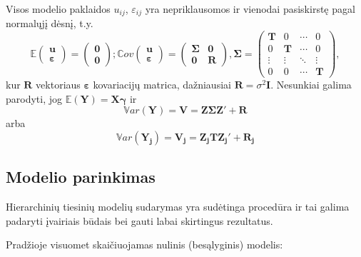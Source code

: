 \documentclass[11pt,a4paper]{article}
\begin{document}
Visos modelio paklaidos $u_{ij}$, $\varepsilon_{ij}$ yra nepriklausomos ir vienodai pasiskirstę pagal normalųjį dėsnį, t.y.
\[\mathbb{E}\begin{pmatrix}
\mathbf{u} \\
\boldsymbol{\varepsilon}
\end{pmatrix}=
\begin{pmatrix}
\mathbf{0} \\
\mathbf{0}
\end{pmatrix};
\mathbb{C}ov\begin{pmatrix}
\mathbf{u} \\
\boldsymbol{\varepsilon}
\end{pmatrix}=
\begin{pmatrix}
\mathbf{\Sigma}&\mathbf{0} \\
\mathbf{0}&\mathbf{R}
\end{pmatrix},
\mathbf{\Sigma}=
\begin{pmatrix}
\mathbf{T} & 0 & \cdots & 0 \\
0 & \mathbf{T} & \cdots & 0\\
\vdots & \vdots & \ddots & \vdots \\
0&0 & \cdots & \mathbf{T}
\end{pmatrix},
\]
kur $\mathbf{R}$ vektoriaus $\boldsymbol{\varepsilon}$ kovariacijų matrica, dažniausiai $\mathbf{R}=\sigma^2\mathbf{I}$. Nesunkiai galima parodyti, jog $\mathbb{E}(\mathbf{Y})=\mathbf{X}\boldsymbol{\gamma}$ ir
\begin{equation} \label{eq:var}
\mathbb{V}ar(\mathbf{Y})=\mathbf{V}=\mathbf{Z\Sigma Z}'+\mathbf{R}
\end{equation}
arba
\begin{equation} \label{eq:varj}
\mathbb{V}ar(\mathbf{Y_j})=\mathbf{V_j}=\mathbf{Z_jTZ_j}'+\mathbf{R_j}
\end{equation}


\subsection{Modelio parinkimas} \label{subsec:parink}
\indent Hierarchinių tiesinių modelių sudarymas yra sudėtinga procedūra ir tai galima padaryti įvairiais būdais bei gauti labai skirtingus rezultatus.

\indent Pradžioje visuomet skaičiuojamas nulinis (besąlyginis) modelis:
\end{document}
